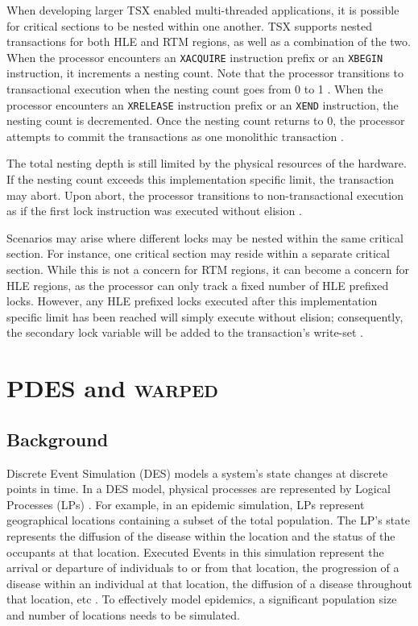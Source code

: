\documentclass[11pt]{book}
\begin{document}
When developing larger TSX enabled multi-threaded applications, it is possible for
critical sections to be nested within one another.  TSX supports nested transactions for
both HLE and RTM regions, as well as a combination of the two.  When the processor
encounters an \texttt{XACQUIRE} instruction prefix or an \texttt{XBEGIN} instruction, it
increments a nesting count.  Note that the processor transitions to transactional
execution when the nesting count goes from 0 to 1 \cite{intel_prog_ref}.  When the
processor encounters an \texttt{XRELEASE} instruction prefix or an \texttt{XEND}
instruction, the nesting count is decremented.  Once the nesting count returns to 0, the
processor attempts to commit the transactions as one monolithic transaction
\cite{intel_prog_ref}.

The total nesting depth is still limited by the physical resources of the hardware.  If
the nesting count exceeds this implementation specific limit, the transaction may abort.
Upon abort, the processor transitions to non-transactional execution as if the first lock
instruction was executed without elision \cite{intel_prog_ref}.

Scenarios may arise where different locks may be nested within the same critical section.
For instance, one critical section may reside within a separate critical section.  While
this is not a concern for RTM regions, it can become a concern for HLE regions, as the
processor can only track a fixed number of HLE prefixed locks.  However, any HLE prefixed
locks executed after this implementation specific limit has been reached will simply
execute without elision; consequently, the secondary lock variable will be added to the
transaction's write-set \cite{intel_prog_ref}.


\chapter{PDES and \textsc{warped}}

\section{Background}

Discrete Event Simulation (DES) models a system's state changes at discrete points in
time.  In a DES model, physical processes are represented by Logical Processes (LPs)
\cite{des_misra}.  For example, in an epidemic simulation, LPs represent geographical
locations containing a subset of the total population.  The LP's state represents the
diffusion of the disease within the location and the status of the occupants at that
location.  Executed Events in this simulation represent the arrival or departure of
individuals to or from that location, the progression of a disease within an individual at
that location, the diffusion of a disease throughout that location, etc
\cite{epidemic}. To effectively model epidemics, a significant population size and number
of locations needs to be simulated.
\end{document}
